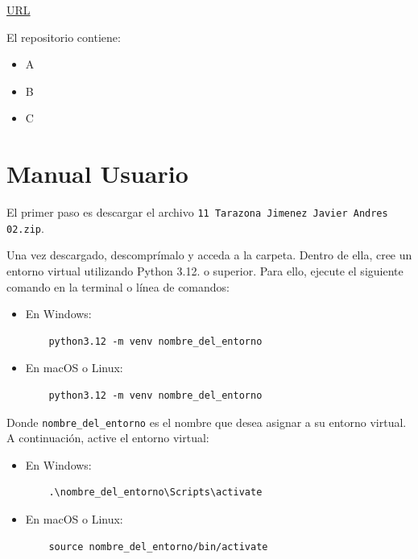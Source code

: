 \documentclass{article}
\begin{document}
\begin{center}
\url{URL}
\end{center}

El repositorio contiene:
\begin{itemize}
\item A
\item B
\item C
\end{itemize}


\section{Manual Usuario}\label{sec:man_u}

El primer paso es descargar el archivo \texttt{11 Tarazona Jimenez Javier Andres 02.zip}.

Una vez descargado, descomprímalo y acceda a la carpeta. Dentro de ella, cree un 
entorno virtual utilizando Python 3.12. o superior. Para ello, ejecute el siguiente 
comando en 
la terminal o línea de comandos:

\begin{itemize}
  \item En Windows:
  \begin{verbatim}
    python3.12 -m venv nombre_del_entorno
  \end{verbatim}
  \item En macOS o Linux:
  \begin{verbatim}
    python3.12 -m venv nombre_del_entorno
  \end{verbatim}
\end{itemize}

Donde \texttt{nombre\_del\_entorno} es el nombre que desea asignar a su entorno virtual. 
A continuación, active el entorno virtual:

\begin{itemize}
  \item En Windows:
  \begin{verbatim}
    .\nombre_del_entorno\Scripts\activate
  \end{verbatim}
  \item En macOS o Linux:
  \begin{verbatim}
    source nombre_del_entorno/bin/activate
  \end{verbatim}
\end{itemize}
\end{document}
